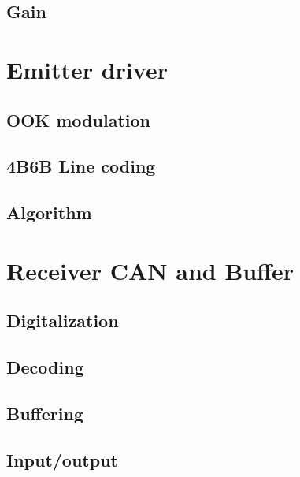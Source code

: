 \subsection{Gain}


\section{Emitter driver}

\subsection{OOK modulation}
\subsection{4B6B Line coding}
\subsection{Algorithm}



\section{Receiver CAN and Buffer}

\subsection{Digitalization}
\subsection{Decoding}
\subsection{Buffering}
\subsection{Input/output}


